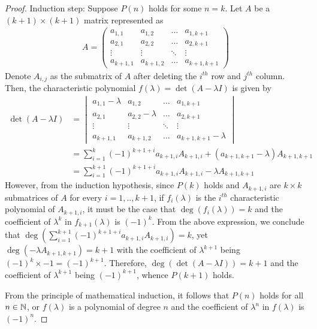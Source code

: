 \begin{proof}
    Induction step: Suppose $P(n)$ holds for some $n=k$.
    Let $A$ be a $(k+1)\times(k+1)$ matrix represented as 
    \[
        \begin{aligned}
            A=\begin{pmatrix}
                a_{1,1} & a_{1,2} & \dots & a_{1,k+1}\\
                a_{2,1} & a_{2,2} & \dots & a_{2,k+1}\\
                \vdots & \vdots & \ddots & \vdots\\
                a_{k+1,1} & a_{k+1,2} & \dots & a_{k+1,k+1}
            \end{pmatrix}
        \end{aligned}
    \]
    Denote $A_{i,j}$ as the submatrix of $A$ after deleting the $i^{th}$ row and $j^{th}$ column.
    Then, the characteristic polynomial $f(\lambda)=\det(A-\lambda I)$ is given by 
    \[
        \begin{aligned}
            \det(A-\lambda I)&=\begin{vmatrix}
                a_{1,1}-\lambda & a_{1,2} & \dots & a_{1,k+1}\\
                a_{2,1} & a_{2,2}-\lambda & \dots & a_{2,k+1}\\
                \vdots & \vdots & \ddots & \vdots\\
                a_{k+1,1} & a_{k+1,2} & \dots & a_{k+1,k+1}-\lambda
            \end{vmatrix}\\
            &=\sum_{i=1}^{k}(-1)^{k+1+i}a_{k+1,i}A_{k+1,i}+(a_{k+1,k+1}-\lambda)A_{k+1,k+1}\\
            &=\sum_{i=1}^{k+1}(-1)^{k+1+i}a_{k+1,i}A_{k+1,i}-\lambda A_{k+1,k+1}
        \end{aligned}
    \]
    However, from the induction hypothesis, since $P(k)$ holds and $A_{k+1,i}$ are $k\times k$ submatrices of $A$ for every $i=1,..,k+1$,
    if $f_i(\lambda)$ is the $i^{th}$ characteristic polynomial of $A_{k+1,i}$, it must be the case that $\deg(f_i(\lambda))=k$ and the coefficient of $\lambda^{k}$ in $f_{k+1}(\lambda)$ is $(-1)^{k}$.
    From the above expression, we conclude that $\deg(\sum_{i=1}^{k+1}(-1)^{k+1+i}a_{k+1,i}A_{k+1,i})=k$, yet $\deg(-\lambda A_{k+1,k+1})=k+1$ with the coefficient of $\lambda^{k+1}$ being $(-1)^k\times -1=(-1)^{k+1}$.
    Therefore, $\deg(\det(A-\lambda I))=k+1$ and the coefficient of $\lambda^{k+1}$ being $(-1)^{k+1}$, whence $P(k+1)$ holds.

    From the principle of mathematical induction, it follows that $P(n)$ holds for all $n\in\mathbb N$, or $f(\lambda)$ is a polynomial of degree $n$ and the coefficient of $\lambda^n$ in $f(\lambda)$ is $(-1)^n$.
\end{proof}
